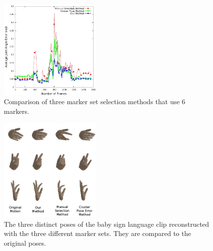 \begin{figure}[ht]
  \centering
  \includegraphics[trim = 28mm 0mm 0mm 0mm,
width=0.45\textwidth]{images/avgError_Marker_sets.jpg} %
  \caption{Comparison of three marker set selection methods that use 6 markers.}
  \label{fig:3_methods}
\end{figure}


\begin{figure}[ht]
  \centering
  \includegraphics[trim = 28mm 0mm 0mm 0mm,
width=0.45\textwidth]{images/compiled_babySigns1_poses.jpg} %
  \caption{The three distinct poses of the baby sign language clip
reconstructed with the three different marker sets. They are compared to
the original poses.}
  \label{fig:BabySigns_methods}
\end{figure}





